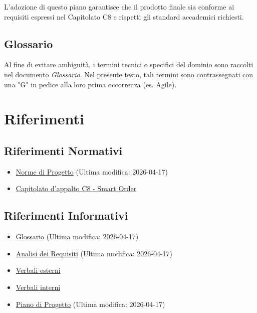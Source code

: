 \documentclass[a4paper,11pt,oneside]{scrartcl}
\begin{document}
L'adozione di questo piano garantisce che il prodotto finale sia conforme ai requisiti espressi nel Capitolato C8 e rispetti gli standard accademici richiesti.

\subsection{Glossario}
Al fine di evitare ambiguità, i termini tecnici o specifici del dominio sono raccolti nel documento \textit{Glossario}.
Nel presente testo, tali termini sono contrassegnati con una "G" in pedice alla loro prima occorrenza (es. Agile{\scriptsize{}}).

\section{Riferimenti}

\subsection{Riferimenti Normativi}
\begin{itemize}
    \item \href{https://github.com/swenightpro/Documentazione/blob/main/docs/PB/Documentazione%20Interna}{Norme di Progetto} (Ultima modifica: 2026-04-17)
    \item \href{https://www.math.unipd.it/~tullio/IS-1/2025/Progetto/C8.pdf}{Capitolato d'appalto C8 - Smart Order}
\end{itemize}

\subsection{Riferimenti Informativi}
\begin{itemize}
    \item \href{https://github.com/swenightpro/Documentazione/blob/main/docs/PB/Documentazione%20Esterna}{Glossario} (Ultima modifica: 2026-04-17)
    \item \href{https://github.com/swenightpro/Documentazione/tree/main/docs/PB/Documentazione%20Esterna}{Analisi dei Requisiti} (Ultima modifica: 2026-04-17)
    \item \href{https://github.com/swenightpro/Documentazione/tree/main/docs/PB/Documentazione%20Esterna/Verbali%20Esterni}{Verbali esterni}
    \item \href{https://github.com/swenightpro/Documentazione/tree/main/docs/PB/Documentazione%20Interna/Verbali%20Interni}{Verbali interni}
    \item \href{https://github.com/swenightpro/Documentazione/tree/main/docs/PB/Documentazione%20Esterna}{Piano di Progetto} (Ultima modifica: 2026-04-17)
\end{itemize}
\end{document}
